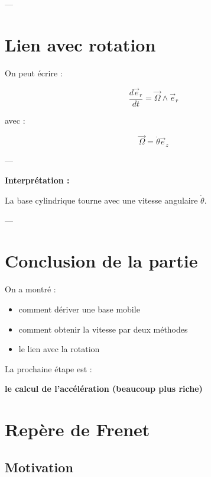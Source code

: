 \documentclass[11pt,a4paper]{article}
\begin{document}
---

\section{Lien avec rotation}

On peut écrire :

\[
\frac{d\vec{e}_r}{dt} = \vec{\Omega} \wedge \vec{e}_r
\]

avec :

\[
\vec{\Omega} = \dot{\theta} \vec{e}_z
\]

---

\textbf{Interprétation :}

\begin{center}
La base cylindrique tourne avec une vitesse angulaire $\dot{\theta}$.
\end{center}

---

\section{Conclusion de la partie}

On a montré :

\begin{itemize}
\item comment dériver une base mobile
\item comment obtenir la vitesse par deux méthodes
\item le lien avec la rotation
\end{itemize}

\bigskip

 La prochaine étape est :

\begin{center}
\textbf{le calcul de l’accélération (beaucoup plus riche)}
\end{center}

\section{Repère de Frenet}

\subsection{Motivation}
\end{document}
